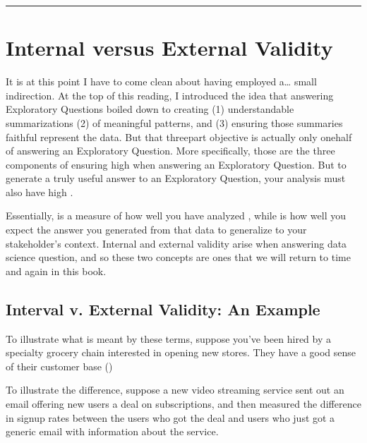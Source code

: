 \documentclass[letterpaper,10pt,english]{jupyterBook}
\begin{document}
\bigskip\hrule\bigskip


\sphinxstepscope


\chapter{Internal versus External Validity}
\label{\detokenize{30_questions/17_exploratory_questions_internal_external:internal-versus-external-validity}}\label{\detokenize{30_questions/17_exploratory_questions_internal_external::doc}}
\sphinxAtStartPar
It is at this point I have to come clean about having employed a… small indirection. At the top of this reading, I introduced the idea that answering Exploratory Questions boiled down to creating (1) understandable summarizations (2) of meaningful patterns, and (3) ensuring those summaries faithful represent the data. But that three\sphinxhyphen{}part objective is actually only one\sphinxhyphen{}half of answering an Exploratory Question. More specifically, those are the three components of ensuring high  when answering an Exploratory Question. But to generate a truly useful answer to an Exploratory Question, your analysis must also have high .

\sphinxAtStartPar
Essentially,  is a measure of how well you have analyzed , while  is how well you expect the answer you generated from that data to generalize to your stakeholder’s context. Internal and external validity arise when answering  data science question, and so these two concepts are ones that we will return to time and again in this book.


\section{Interval v. External Validity: An Example}
\label{\detokenize{30_questions/17_exploratory_questions_internal_external:interval-v-external-validity-an-example}}
\sphinxAtStartPar
To illustrate what is meant by these terms, suppose you’ve been hired by a specialty grocery chain interested in opening new stores. They have a good sense of their customer base ()

\sphinxAtStartPar
To illustrate the difference, suppose a new video streaming service sent out an e\sphinxhyphen{}mail offering new users a deal on subscriptions, and then measured the difference in sign\sphinxhyphen{}up rates between the users who got the deal and users who just got a generic e\sphinxhyphen{}mail with information about the service.
\end{document}
